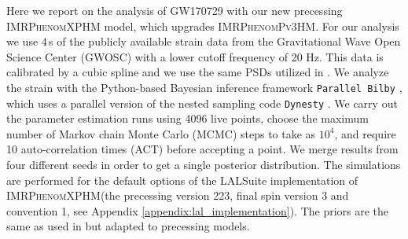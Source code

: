 \documentclass[%
aps,
prd,
amssymb,
amsmath,
amsfonts,
eqsecnum,
showpacs,
nofootinbib,
floatfix,
twocolumn,
twoside,
a4paper,
superscriptaddress
]{revtex4-1}
\newcommand{\phPvthreehm}{\textsc{IMRPhenomPv3HM}\xspace}
\newcommand{\phXPHM}{\textsc{IMRPhenomXPHM}\xspace}
\begin{document}
Here we report on the analysis of GW170729 with our new precessing  \phXPHM model, which upgrades \phPvthreehm. For our analysis we use $4$\,s of the publicly available strain data from the Gravitational Wave Open Science Center (GWOSC) \cite{GWOSC,Abbott:2019ebz} with a lower cutoff frequency of 20 Hz. This data is calibrated by a cubic spline and we use the same PSDs utilized in  \cite{LIGOScientific:2018mvr}. We analyze the strain with the Python-based Bayesian inference framework \texttt{Parallel Bilby} \cite{Smith:2019ucc}, which uses a parallel version of the nested sampling code \texttt{Dynesty} \cite{Speagle:2020spe}. We carry out the parameter estimation runs using 4096 live points, choose the maximum number of Markov chain Monte Carlo (MCMC) steps to take 
as $10^4$, and require 10 auto-correlation times (ACT) before accepting a point. We merge results from four different seeds in order to get a single posterior distribution. The simulations are performed for the default options of the LALSuite implementation of \phXPHM (the precessing version 223, final spin version 3 and convention 1, see Appendix \ref{appendix:lal_implementation}). The priors are the same as used in \cite{Chatziioannou:2019dsz} but adapted to precessing models.
\end{document}
